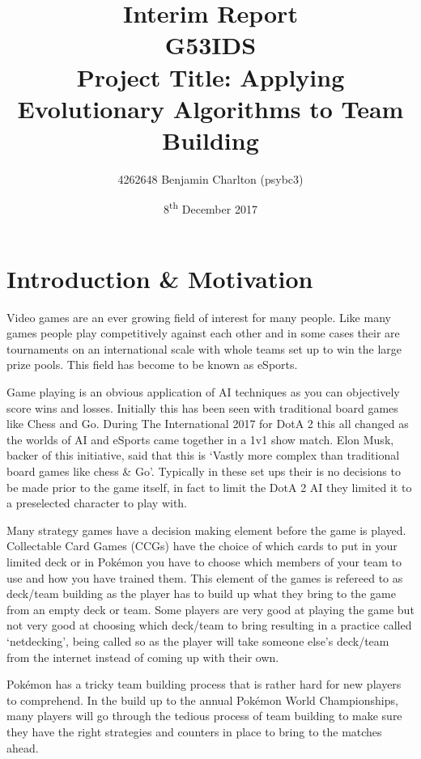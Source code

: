 \documentclass[a4paper]{article}
\title{
    Interim Report
    \\ \large{G53IDS}
    \\ \large{Project Title: Applying Evolutionary Algorithms to \Pokemon{} Team Building}\vspace{-3ex}}
\author{4262648 Benjamin Charlton (psybc3)}
\date{\vspace{-2ex}8\textsuperscript{th} December 2017}
\newcommand{\Pokemon}{Pok\'{e}mon}
\begin{document}
\maketitle
\pagebreak

\tableofcontents
\pagebreak

\section{Introduction \& Motivation}
\par
Video games are an ever growing field of interest for many people.
Like many games people play competitively against each other and in some cases their are tournaments on an international scale with whole teams set up to win the large prize pools\cite{eSportsPrize}\cite{teamEarnings}.
This field has become to be known as eSports.
\par
Game playing is an obvious application of AI techniques as you can objectively score wins and losses.
Initially this has been seen with traditional board games like Chess\cite{deepBlue} and Go\cite{alphaGo}.
During The International 2017 for DotA 2 this all changed as the worlds of AI and eSports came together in a 1v1 show match\cite{openAI}.
Elon Musk, backer of this initiative, said that this is `Vastly more complex than traditional board games like chess \& Go'\cite{openAI}.
Typically in these set ups their is no decisions to be made prior to the game itself, in fact to limit the DotA 2 AI they limited it to a preselected character to play with.
\par
Many strategy games have a decision making element before the game is played.
Collectable Card Games (CCGs) have the choice of which cards to put in your limited deck or in \Pokemon{} you have to choose which members of your team to use and how you have trained them.
This element of the games is refereed to as deck/team building as the player has to build up what they bring to the game from an empty deck or team.
Some players are very good at playing the game but not very good at choosing which deck/team to bring resulting in a practice called `netdecking', being called so as the player will take someone else's deck/team from the internet instead of coming up with their own.
\par
\Pokemon{} has a tricky team building process that is rather hard for new players to comprehend.
In the build up to the annual \Pokemon{} World Championships, many players will go through the tedious process of team building to make sure they have the right strategies and counters in place to bring to the matches ahead\cite{worldsOverview}.
\end{document}
